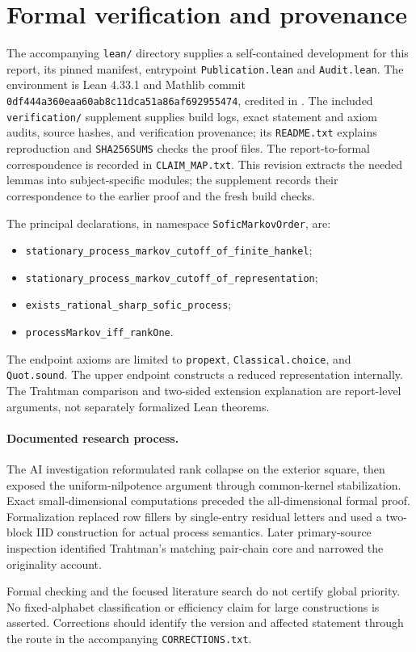 \section{Formal verification and provenance}
The accompanying \texttt{lean/} directory supplies a self-contained development for this report, its pinned manifest, entrypoint \texttt{Publication.lean} and \texttt{Audit.lean}. The environment is Lean 4.33.1 and Mathlib commit \texttt{0df444a360eaa60ab8c11dca51a86af692955474}, credited in \cite{Lean,Mathlib}. The included \texttt{verification/} supplement supplies build logs, exact statement and axiom audits, source hashes, and verification provenance; its \texttt{README.txt} explains reproduction and \texttt{SHA256SUMS} checks the proof files. The report-to-formal correspondence is recorded in \texttt{CLAIM\_MAP.txt}. This revision extracts the needed lemmas into subject-specific modules; the supplement records their correspondence to the earlier proof and the fresh build checks.

The principal declarations, in namespace \texttt{SoficMarkovOrder}, are:
\begin{itemize}
\item \texttt{stationary\_process\_markov\_cutoff\_of\_finite\_hankel};
\item \texttt{stationary\_process\_markov\_cutoff\_of\_representation};
\item \texttt{exists\_rational\_sharp\_sofic\_process};
\item \texttt{processMarkov\_iff\_rankOne}.
\end{itemize}
The endpoint axioms are limited to \texttt{propext}, \texttt{Classical.choice}, and \texttt{Quot.sound}. The upper endpoint constructs a reduced representation internally. The Trahtman comparison and two-sided extension explanation are report-level arguments, not separately formalized Lean theorems.

\paragraph{Documented research process.}
The AI investigation reformulated rank collapse on the exterior square, then exposed the uniform-nilpotence argument through common-kernel stabilization. Exact small-dimensional computations preceded the all-dimensional formal proof. Formalization replaced row fillers by single-entry residual letters and used a two-block IID construction for actual process semantics. Later primary-source inspection identified Trahtman's matching pair-chain core and narrowed the originality account.

Formal checking and the focused literature search do not certify global priority. No fixed-alphabet classification or efficiency claim for large constructions is asserted. Corrections should identify the version and affected statement through the route in the accompanying \texttt{CORRECTIONS.txt}.





